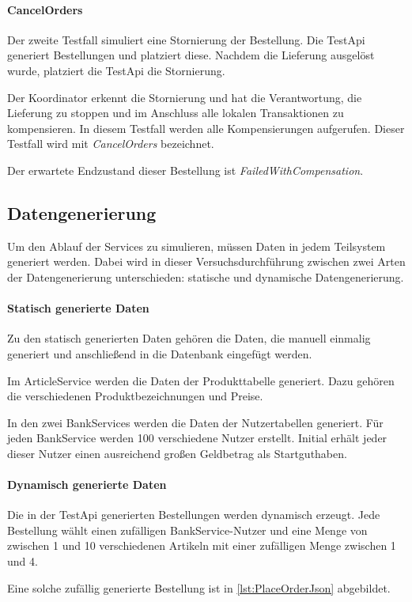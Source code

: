 \paragraph*{CancelOrders}
Der zweite Testfall simuliert eine Stornierung der Bestellung. Die TestApi generiert Bestellungen und platziert diese. Nachdem die Lieferung ausgelöst wurde, platziert die TestApi die Stornierung. 

Der Koordinator erkennt die Stornierung und hat die Verantwortung, die Lieferung zu stoppen und im Anschluss alle lokalen Transaktionen zu kompensieren. In diesem Testfall werden alle Kompensierungen aufgerufen. Dieser Testfall wird mit \textit{CancelOrders} bezeichnet. 

Der erwartete Endzustand dieser Bestellung ist \textit{FailedWithCompensation}.
\subsection{Datengenerierung}
Um den Ablauf der Services zu simulieren, müssen Daten in jedem Teilsystem generiert werden. Dabei wird in dieser Versuchsdurchführung zwischen zwei Arten der Datengenerierung unterschieden: statische und dynamische Datengenerierung.

\paragraph*{Statisch generierte Daten}
Zu den statisch generierten Daten gehören die Daten, die manuell einmalig generiert und anschließend in die Datenbank eingefügt werden.

Im ArticleService werden die Daten der Produkttabelle generiert. Dazu gehören die verschiedenen Produktbezeichnungen und Preise.

In den zwei BankServices werden die Daten der Nutzertabellen generiert. Für jeden BankService werden 100 verschiedene Nutzer erstellt. Initial erhält jeder dieser Nutzer einen ausreichend großen Geldbetrag als Startguthaben. 

\paragraph*{Dynamisch generierte Daten}
Die in der TestApi generierten Bestellungen werden dynamisch erzeugt. Jede Bestellung wählt einen zufälligen BankService-Nutzer und eine Menge von zwischen 1 und 10 verschiedenen Artikeln mit einer zufälligen Menge zwischen 1 und 4.

Eine solche zufällig generierte Bestellung ist in \cref{lst:PlaceOrderJson} abgebildet.



